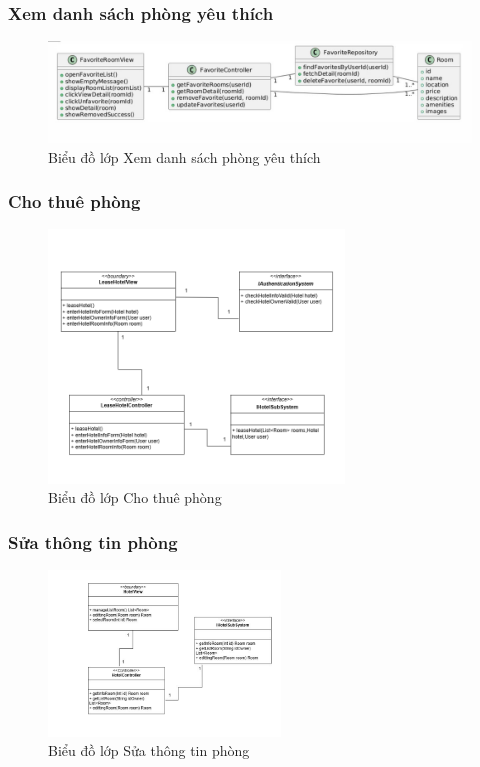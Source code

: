 \subsubsection{Xem danh sách phòng yêu thích}
\begin{figure}[H]
    \centering
    \includegraphics[width=\textwidth]{img3.4.2/xemphongyeu4.jpg} 
    \caption{Biểu đồ lớp Xem danh sách phòng yêu thích}
\end{figure}

\subsubsection{Cho thuê phòng}
\begin{figure}[H]
    \centering
    \includegraphics[width=0.7\textwidth]{img3.4.2/chothuephong.png} 
    \caption{Biểu đồ lớp Cho thuê phòng}
\end{figure}

\subsubsection{Sửa thông tin phòng}
\begin{figure}[H]
    \centering
    \includegraphics[width=0.55\textwidth]{img3.4.2/doithongtinphong.jpg} 
    \caption{Biểu đồ lớp Sửa thông tin phòng}
\end{figure}

